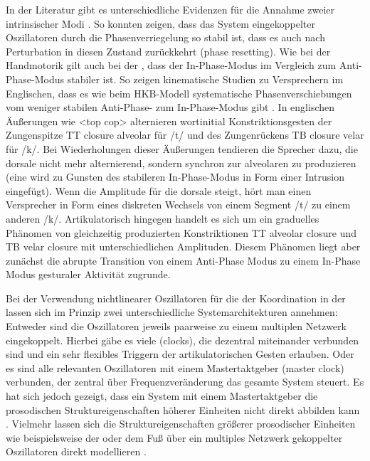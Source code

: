 In der Literatur gibt es unterschiedliche Evidenzen für die Annahme zweier intrinsischer Modi \citep[vgl.][]{Nam2009b}. So konnten \citet{Saltzman1998} zeigen, dass das System eingekoppelter Oszillatoren durch die Phasenverriegelung so stabil ist, dass es auch nach Perturbation in diesen Zustand zurückkehrt (phase resetting). Wie bei der Handmotorik gilt auch bei der , dass der In-Phase-Modus im Vergleich zum Anti-Phase-Modus stabiler ist. So zeigen kinematische Studien zu Versprechern im Englischen, dass es wie beim HKB-Modell systematische Phasenverschiebungen vom weniger stabilen Anti-Phase- zum In-Phase-Modus gibt \citep{Pouplier2005,Pouplier2007,Goldstein2007}. In englischen Äußerungen wie <top cop> alternieren wortinitial Konstriktionsgesten der Zungenspitze {TT closure alveolar} für /t/ und des Zungenrückens {TB closure velar} für /k/. Bei Wiederholungen dieser Äußerungen tendieren die Sprecher dazu, die dorsale  nicht mehr alternierend, sondern synchron zur alveolaren  zu produzieren (eine  wird zu Gunsten des stabileren In-Phase-Modus in Form einer Intrusion eingefügt). Wenn die Amplitude für die dorsale  steigt, hört man einen Versprecher in Form eines diskreten Wechsels von einem Segment /t/ zu einem anderen /k/. Artikulatorisch hingegen handelt es sich um ein graduelles Phänomen von gleichzeitig produzierten Konstriktionen {TT alveolar closure} und {TB velar closure} mit unterschiedlichen Amplituden. Diesem Phänomen liegt aber zunächst die abrupte Transition von einem Anti-Phase Modus zu einem In-Phase Modus gesturaler Aktivität zugrunde.

Bei der Verwendung nichtlinearer Oszillatoren für die  der Koordination in der  lassen sich im Prinzip zwei unterschiedliche Systemarchitekturen annehmen: Entweder sind die Oszillatoren jeweils paarweise zu einem multiplen Netzwerk eingekoppelt. Hierbei gäbe es viele  (clocks), die dezentral miteinander verbunden sind und ein sehr flexibles Triggern der artikulatorischen Gesten erlauben. Oder es sind alle relevanten Oszillatoren mit einem Mastertaktgeber (master clock) verbunden, der zentral über Frequenzveränderung das gesamte System steuert. Es hat sich jedoch gezeigt, dass ein System mit einem Mastertaktgeber die prosodischen Struktureigenschaften höherer Einheiten nicht direkt abbilden kann \citep{Goldstein2009}. Vielmehr lassen sich die Struktureigenschaften größerer prosodischer Einheiten wie beispielsweise der  oder dem Fuß über ein multiples Netzwerk gekoppelter Oszillatoren direkt modellieren \citep{Saltzman2000, Nam2003, Goldstein2009, Nam2009a}.

